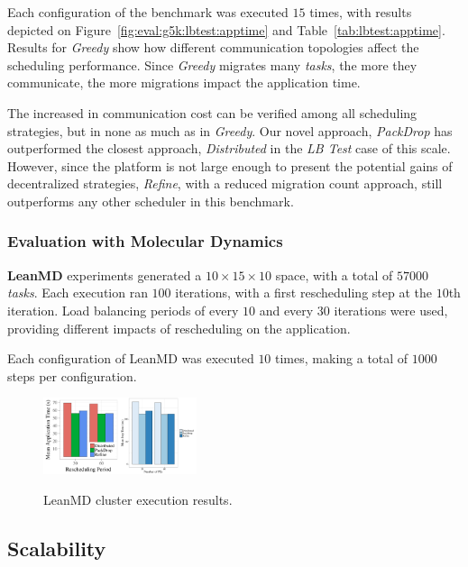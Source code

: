 Each configuration of the benchmark was executed $15$ times, with results depicted on Figure~\ref{fig:eval:g5k:lbtest:apptime} and Table~\ref{tab:lbtest:apptime}.
Results for \textit{Greedy} show how different communication topologies affect the scheduling performance.
Since \textit{Greedy} migrates many \textit{tasks}, the more they communicate, the more migrations impact the application time.

The increased in communication cost can be verified among all scheduling strategies, but in none as much as in \textit{Greedy}.
Our novel approach, \textit{PackDrop} has outperformed the closest approach, \textit{Distributed} in the \textit{LB Test} case of this scale.
However, since the platform is not large enough to present the potential gains of decentralized strategies, \textit{Refine}, with a reduced migration count approach, still outperforms any other scheduler in this benchmark.

\subsubsection*{Evaluation with Molecular Dynamics}

\textbf{LeanMD} experiments generated a $10\times15\times10$ space, with a total of $57000$ \textit{tasks}.
Each execution ran $100$ iterations, with a first rescheduling step at the $10$th iteration. 
Load balancing periods of every $10$ and every $30$ iterations were used, providing different impacts of rescheduling on the application.

Each configuration of LeanMD was executed $10$ times, making a total of $1000$ steps per configuration. 

\begin{figure}
	\centering
    \includegraphics[width=0.2\textwidth]{images/apptime_leanmd_g5k.pdf}\includegraphics[width=0.2\textwidth]{images/steptime_leanmd_g5k.pdf}
    \caption{LeanMD cluster execution results.}
    \label{fig:eval:g5k:leanmd:time}
\end{figure}

\subsection{Scalability}